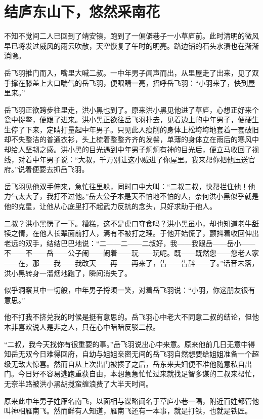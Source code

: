 \chapter{结庐东山下，悠然采南花}
\label{chap:cai-ju-dong-nan-xia}

不知不觉间二人已回到了靖安镇，跑到了一偏僻巷子一小草庐前。此时清明的微风早已将发过威风的雨云吹散，天空恢复了午时的明亮。路边铺的石头水渍也在渐渐消隐。

岳飞羽推门而入，嘴里大喊二叔。一中年男子闻声而出，从里屋走了出来，见了双手撑在膝盖上大口喘气的岳飞羽，便眼睛一亮，招呼岳飞羽：“小羽来了，快到屋里来。”

岳飞羽正欲跨步往里走，洪小黑也到了。原来洪小黑见他进了草庐，心想正好来个瓮中捉鳖，便跟了进来。洪小黑正欲往岳飞羽扑去，见着边上的中年男子，便硬生生停了下来，定睛打量起中年男子。只见此人瘦削的身体上松垮垮地套着一套破旧却不失整洁的普通衣衫，头上梳着整整齐齐的发髻，单薄的身体立在雨后的寒风中却给人坚韧之感。洪小黑的目光遇到中年男子炯炯有神的目光后，便立马收回了视线，对着中年男子说：“大叔，千万别让这小贼进了你屋里。我来帮你把他压送官府。”说着便要去抓岳飞羽。

岳飞羽见他双手伸来，急忙往里躲，同时口中大叫：“二叔二叔，快帮拦住他！他力气太大了，我打不过他。”岳大公子本是天不怕地不怕的人，奈何洪小黑似乎就是他的克星，让他从心底里打不起武力反抗的念头，只好求助于他人。

二叔？洪小黑愣了一下。糟糕，这不是虎口夺食吗？洪小黑虽小，却也知道老牛舐犊之情，在他人长辈面前打人，焉有不被打之理。于他开始慌了，颤抖着收回伸出老远的双手，结结巴巴地说：“二------二------二叔好，我------我跟岳------岳小------不------不------岳------公子闹------闹着------玩------玩呢。既------既然您------您老人家------在，那------我------我改天------再------再来了，告------告辞------了。”话音未落，洪小黑转身一溜烟地跑了，瞬间消失了。

似乎洞察其中一切般，中年男子捋须一笑，对着岳飞羽说：“小羽，你这朋友很有意思。”

他不打我不挤兑我的时候是挺有意思的。岳飞羽心中老大不同意二叔的结论，但他本非喜欢说人是非之人，只在心中暗暗反驳二叔。

“二叔，我今天找你有很重要的事。”岳飞羽说出心中来意。原来他前几日无意中得知岳无双今日难得回府，自幼与姐姐亲密无间的岳飞羽自然想要给姐姐准备一个超级无敌大惊喜。然而自从上次出门被揍了之后，岳东来夫妇便不准他随意私自出门。今日好不容易逃跑重获自由，本想急急忙忙过来就找足智多谋的二叔来帮忙，无奈半路被洪小黑胡搅蛮缠浪费了大半天时间。

原来此中年男子姓雁名南飞，以面相与谋略闻名于草庐小巷一隅，附近百姓都管他叫神相雁南飞。然而鲜有人知道，雁南飞还有一本事，就是打铁，也就是铁匠。

